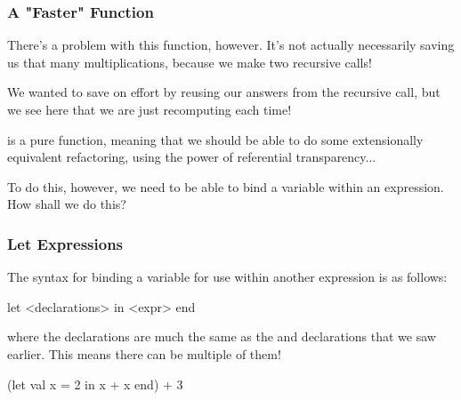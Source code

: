 \documentclass[aspectratio=169]{beamer}
\begin{document}
\begin{frame}[fragile]
  \frametitle{A "Faster" Function}

  There's a problem with this function, however. It's not actually necessarily
  saving us that many multiplications, because we make two recursive calls!

  \vspace{\fill}

  We wanted to save on effort by reusing our answers from the recursive call, 
  but we see here that we are just recomputing each time!

  \pause
  \vspace{\fill}

   is a pure function, meaning that we should be able to do some
  extensionally equivalent refactoring, using the power of referential
  transparency...

  \vspace{\fill}

  To do this, however, we need to be able to bind a variable within an
  expression. How shall we do this?
\end{frame}

\begin{frame}[fragile]
  \frametitle{Let Expressions}

  {\small
  The syntax for binding a variable for use within another expression is as follows:

  \pause
  \vspace{\fill}

  \begin{codeblock}
    let 
      <declarations>
    in 
      <expr>
    end
  \end{codeblock}

  where the declarations are much the same as the  and  declarations
  that we saw earlier. This means there can be multiple of them!

  \pause
  \vspace{\fill}

  \begin{codeblock}
    (let 
      val x = 2
    in 
      x + x
    end) + 3
  \end{codeblock}
  }
\end{frame}
\end{document}
